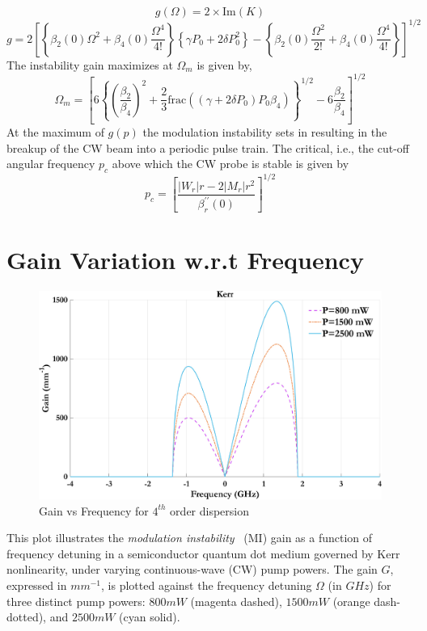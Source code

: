 \documentclass[12pt,a4paper]{article}
\begin{document}
\begin{equation}
g(\Omega) = 2 \times \text{Im}(K)
\end{equation}
\begin{equation}
g = 2 {\left[ \left\{ \beta_2(0) \Omega^2 + \beta_4(0) \frac{\Omega^4}{4!} \right\} \left\{ \gamma P_0 + 2 \delta P_0^2 \right\} - \left\{ \beta_2(0) \frac{\Omega^2}{2!} + \beta_4(0) \frac{\Omega^4}{4!} \right\} \right]}^{1/2}
\end{equation}
The instability gain maximizes at $\Omega_m$ is given by,
\begin{equation}
\Omega_m = {\left[ 6 {\left\{ {\left( \frac{\beta_2}{\beta_4} \right)}^2 + \frac{2}{3} \text{frac} \left( (\gamma + 2\delta P_0) P_0 \beta_4 \right) \right\}}^{1/2} - 6 \frac{\beta_2}{\beta_4} \right]}^{1/2}
\end{equation}
At the maximum of \(g(p)\) the modulation instability sets in resulting in the breakup of the CW beam into a periodic pulse train. The critical, i.e., the cut-off angular frequency \(p_c\) above which the CW probe is stable is given by
\begin{equation}
p_c = {\left[ \frac{|W_r|r - 2|M_r|r^2}{\beta^{\prime\prime}_r(0)} \right]}^{1/2}
\end{equation}
\vspace{0pt}

\section{Gain Variation w.r.t Frequency}

\begin{figure}[h]
    \centering
    \includegraphics[width=0.7\linewidth]{Plots/G_v_Power.jpeg}
    \caption{Gain vs Frequency for $4^{th}$ order dispersion}
    \label{fig:G_v_P}
\end{figure}
This plot illustrates the \textit{modulation instability}~\cite{lighthall} (MI) gain as a function of frequency detuning in a semiconductor quantum dot medium governed by Kerr nonlinearity, under varying continuous-wave (CW) pump powers. The gain \( G \), expressed in ${mm^{-1}}$, is plotted against the frequency detuning \( \Omega \) (in ${GHz}$) for three distinct pump powers: ${800}{mW}$ (magenta dashed), ${1500}{mW}$ (orange dash-dotted), and ${2500}{mW}$ (cyan solid).
\end{document}
